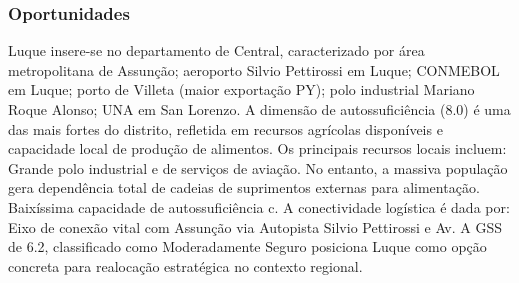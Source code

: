 \newpage

\subsubsection*{Oportunidades}\label{oport-luque-1109}
Luque insere-se no departamento de Central, caracterizado por área metropolitana de Assunção; aeroporto Silvio Pettirossi em Luque; CONMEBOL em Luque; porto de Villeta (maior exportação PY); polo industrial Mariano Roque Alonso; UNA em San Lorenzo. A dimensão de autossuficiência (8.0) é uma das mais fortes do distrito, refletida em recursos agrícolas disponíveis e capacidade local de produção de alimentos. Os principais recursos locais incluem: Grande polo industrial e de serviços de aviação. No entanto, a massiva população gera dependência total de cadeias de suprimentos externas para alimentação. Baixíssima capacidade de autossuficiência c. A conectividade logística é dada por: Eixo de conexão vital com Assunção via Autopista Silvio Pettirossi e Av. A GSS de 6.2, classificado como Moderadamente Seguro posiciona Luque como opção concreta para realocação estratégica no contexto regional.

